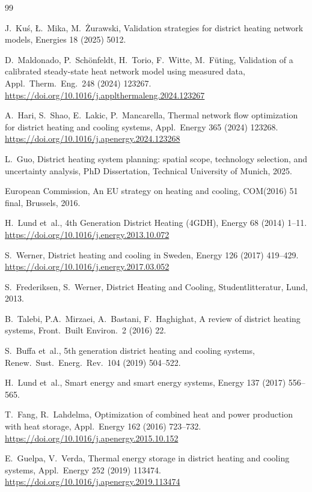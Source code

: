 \documentclass[review,3p]{elsarticle}
\begin{document}
\begin{thebibliography}{99}

J.~Ku\'{s}, {\L}.~Mika, M.~{\.Z}urawski,
Validation strategies for district heating network models,
Energies 18 (2025) 5012.

D.~Maldonado, P.~Sch\"{o}nfeldt, H.~Torio, F.~Witte, M.~F\"{u}ting,
Validation of a calibrated steady-state heat network model using
measured data,
Appl.\ Therm.\ Eng.\ 248 (2024) 123267.
\url{https://doi.org/10.1016/j.applthermaleng.2024.123267}

A.~Hari, S.~Shao, E.~Lakic, P.~Mancarella,
Thermal network flow optimization for district heating and cooling
systems,
Appl.\ Energy 365 (2024) 123268.
\url{https://doi.org/10.1016/j.apenergy.2024.123268}

L.~Guo,
District heating system planning: spatial scope, technology selection,
and uncertainty analysis,
PhD Dissertation, Technical University of Munich, 2025.

European Commission, An EU strategy on heating and cooling,
COM(2016) 51 final, Brussels, 2016.

H.~Lund et~al.,
4th Generation District Heating (4GDH),
Energy 68 (2014) 1--11.
\url{https://doi.org/10.1016/j.energy.2013.10.072}

S.~Werner,
District heating and cooling in Sweden,
Energy 126 (2017) 419--429.
\url{https://doi.org/10.1016/j.energy.2017.03.052}

S.~Frederiksen, S.~Werner,
District Heating and Cooling, Studentlitteratur, Lund, 2013.

B.~Talebi, P.A.~Mirzaei, A.~Bastani, F.~Haghighat,
A review of district heating systems,
Front.\ Built Environ.\ 2 (2016) 22.

S.~Buffa et~al.,
5th generation district heating and cooling systems,
Renew.\ Sust.\ Energ.\ Rev.\ 104 (2019) 504--522.

H.~Lund et~al.,
Smart energy and smart energy systems,
Energy 137 (2017) 556--565.

T.~Fang, R.~Lahdelma,
Optimization of combined heat and power production with heat storage,
Appl.\ Energy 162 (2016) 723--732.
\url{https://doi.org/10.1016/j.apenergy.2015.10.152}

E.~Guelpa, V.~Verda,
Thermal energy storage in district heating and cooling systems,
Appl.\ Energy 252 (2019) 113474.
\url{https://doi.org/10.1016/j.apenergy.2019.113474}


\end{thebibliography}
\end{document}
